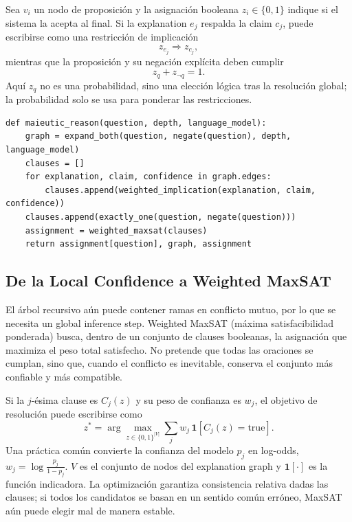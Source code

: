 Sea $v_i$ un nodo de proposición y la asignación booleana $z_i\in\{0,1\}$ indique si el sistema la acepta al final. Si la explanation $e_j$ respalda la claim $c_j$, puede escribirse como una restricción de implicación
\begin{equation}
z_{e_j}\Rightarrow z_{c_j},
\end{equation}
mientras que la proposición y su negación explícita deben cumplir
\begin{equation}
z_q+z_{\neg q}=1.
\end{equation}
Aquí $z_q$ no es una probabilidad, sino una elección lógica tras la resolución global; la probabilidad solo se usa para ponderar las restricciones.

\begin{lstlisting}[caption={Pseudocódigo de explicación recursiva y consistencia global en Maieutic Prompting}]
def maieutic_reason(question, depth, language_model):
    graph = expand_both(question, negate(question), depth, language_model)
    clauses = []
    for explanation, claim, confidence in graph.edges:
        clauses.append(weighted_implication(explanation, claim, confidence))
    clauses.append(exactly_one(question, negate(question)))
    assignment = weighted_maxsat(clauses)
    return assignment[question], graph, assignment
\end{lstlisting}

\subsection{De la Local Confidence a Weighted MaxSAT}

El árbol recursivo aún puede contener ramas en conflicto mutuo, por lo que se necesita un global inference step. Weighted MaxSAT (máxima satisfacibilidad ponderada) busca, dentro de un conjunto de clauses booleanas, la asignación que maximiza el peso total satisfecho. No pretende que todas las oraciones se cumplan, sino que, cuando el conflicto es inevitable, conserva el conjunto más confiable y más compatible.


Si la $j$-ésima clause es $C_j(z)$ y su peso de confianza es $w_j$, el objetivo de resolución puede escribirse como
\begin{equation}
z^*=\arg\max_{z\in\{0,1\}^{|V|}}
\sum_j w_j\,\mathbf{1}\!\left[C_j(z)=\mathrm{true}\right].
\end{equation}
Una práctica común convierte la confianza del modelo $p_j$ en log-odds, $w_j=\log\frac{p_j}{1-p_j}$. $V$ es el conjunto de nodos del explanation graph y $\mathbf{1}[\cdot]$ es la función indicadora. La optimización garantiza consistencia relativa dadas las clauses; si todos los candidatos se basan en un sentido común erróneo, MaxSAT aún puede elegir mal de manera estable.

